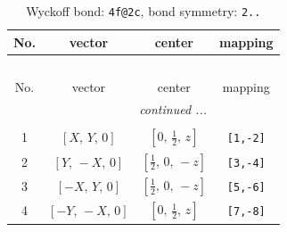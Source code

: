 \documentclass[fleqn,8pt]{jsarticle}
\begin{document}
\renewcommand{\arraystretch}{1.2}
\begin{longtable}{cccc}
\caption{Wyckoff bond: {\tt 4f@2c}, bond symmetry: {\tt 2..}}
 \\
 \hline \hline
No. & vector & center & mapping \\ \hline \endfirsthead

\multicolumn{3}{l}{\tablename\ \thetable{}} \\
 \hline \hline
No. & vector & center & mapping \\ \hline \endhead

 \hline \hline
\multicolumn{3}{r}{\footnotesize\it continued ...} \\ \endfoot

 \hline \hline
\multicolumn{3}{r}{} \\ \endlastfoot

1 & $\left[ X,\, Y,\, 0 \right]$ & $\left[ 0,\, \frac{1}{2},\, z \right]$ & {\tt [1,-2]} \\ \hline
2 & $\left[ Y,\, - X,\, 0 \right]$ & $\left[ \frac{1}{2},\, 0,\, - z \right]$ & {\tt [3,-4]} \\ \hline
3 & $\left[ - X,\, Y,\, 0 \right]$ & $\left[ \frac{1}{2},\, 0,\, - z \right]$ & {\tt [5,-6]} \\ \hline
4 & $\left[ - Y,\, - X,\, 0 \right]$ & $\left[ 0,\, \frac{1}{2},\, z \right]$ & {\tt [7,-8]} \\
\end{longtable}
\renewcommand{\arraystretch}{1.2}
\end{document}
